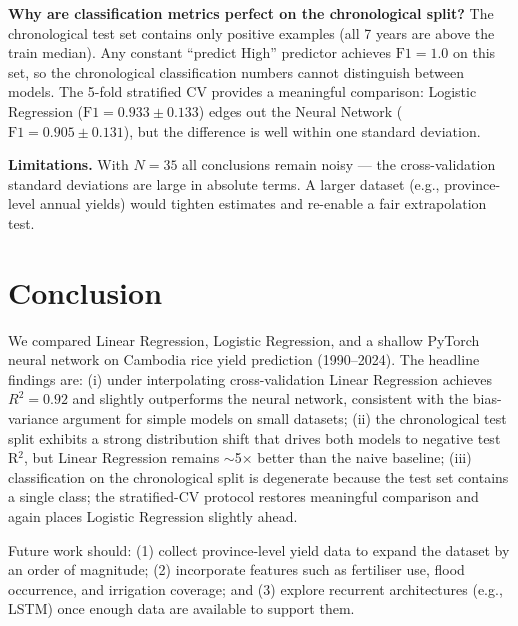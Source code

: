 \documentclass[conference]{IEEEtran}
\begin{document}
\noindent\textbf{Why are classification metrics perfect on the chronological split?}
The chronological test set contains only positive examples (all 7 years are above the train median). Any constant ``predict High'' predictor achieves $\text{F1} = 1.0$ on this set, so the chronological classification numbers cannot distinguish between models. The 5-fold stratified CV provides a meaningful comparison: Logistic Regression ($\text{F1} = 0.933 \pm 0.133$) edges out the Neural Network ($\text{F1} = 0.905 \pm 0.131$), but the difference is well within one standard deviation.

\noindent\textbf{Limitations.}
With $N = 35$ all conclusions remain noisy --- the cross-validation standard deviations are large in absolute terms. A larger dataset (e.g., province-level annual yields) would tighten estimates and re-enable a fair extrapolation test.

\section{Conclusion}

We compared Linear Regression, Logistic Regression, and a shallow PyTorch neural network on Cambodia rice yield prediction (1990--2024). The headline findings are: (i) under interpolating cross-validation Linear Regression achieves $R^2 = 0.92$ and slightly outperforms the neural network, consistent with the bias-variance argument for simple models on small datasets; (ii) the chronological test split exhibits a strong distribution shift that drives both models to negative test R$^2$, but Linear Regression remains $\sim$5$\times$ better than the naive baseline; (iii) classification on the chronological split is degenerate because the test set contains a single class; the stratified-CV protocol restores meaningful comparison and again places Logistic Regression slightly ahead.

Future work should: (1) collect province-level yield data to expand the dataset by an order of magnitude; (2) incorporate features such as fertiliser use, flood occurrence, and irrigation coverage; and (3) explore recurrent architectures (e.g., LSTM) once enough data are available to support them.
\end{document}

